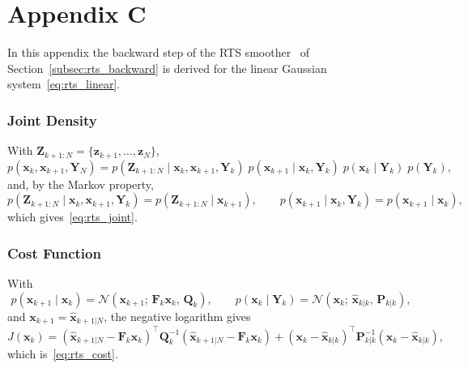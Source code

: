 \chapter*{Appendix C}
\label{app:rts}

In this appendix the backward step of the RTS smoother~\cite{rauch1965,sarkka2013book} of
Section~\ref{subsec:rts_backward} is derived for the linear Gaussian
system~\eqref{eq:rts_linear}.

\subsection*{Joint Density}

With $\mathbf{Z}_{k+1:N} = \{\mathbf{z}_{k+1}, \dots, \mathbf{z}_N\}$,
\begin{equation}
    p(\mathbf{x}_k, \mathbf{x}_{k+1}, \mathbf{Y}_N) =
    p(\mathbf{Z}_{k+1:N} \mid \mathbf{x}_k, \mathbf{x}_{k+1}, \mathbf{Y}_k)\;
    p(\mathbf{x}_{k+1} \mid \mathbf{x}_k, \mathbf{Y}_k)\;
    p(\mathbf{x}_k \mid \mathbf{Y}_k)\;
    p(\mathbf{Y}_k),
\end{equation}
and, by the Markov property,
\begin{equation}
    p(\mathbf{Z}_{k+1:N} \mid \mathbf{x}_k, \mathbf{x}_{k+1}, \mathbf{Y}_k)
    = p(\mathbf{Z}_{k+1:N} \mid \mathbf{x}_{k+1}),
    \qquad
    p(\mathbf{x}_{k+1} \mid \mathbf{x}_k, \mathbf{Y}_k) = p(\mathbf{x}_{k+1} \mid \mathbf{x}_k),
\end{equation}
which gives~\eqref{eq:rts_joint}.

\subsection*{Cost Function}

With
\begin{equation}
    p(\mathbf{x}_{k+1} \mid \mathbf{x}_k) = \mathcal{N}\!\left(\mathbf{x}_{k+1};\,
    \mathbf{F}_k\mathbf{x}_k,\, \mathbf{Q}_k\right),
    \qquad
    p(\mathbf{x}_k \mid \mathbf{Y}_k) = \mathcal{N}\!\left(\mathbf{x}_k;\,
    \hat{\mathbf{x}}_{k|k},\, \mathbf{P}_{k|k}\right),
\end{equation}
and $\mathbf{x}_{k+1} = \hat{\mathbf{x}}_{k+1|N}$, the negative logarithm gives
\begin{equation}
    J(\mathbf{x}_k) =
    \left(\hat{\mathbf{x}}_{k+1|N} - \mathbf{F}_k\mathbf{x}_k\right)^\top \mathbf{Q}_k^{-1}
    \left(\hat{\mathbf{x}}_{k+1|N} - \mathbf{F}_k\mathbf{x}_k\right)
    + \left(\mathbf{x}_k - \hat{\mathbf{x}}_{k|k}\right)^\top \mathbf{P}_{k|k}^{-1}
    \left(\mathbf{x}_k - \hat{\mathbf{x}}_{k|k}\right),
\end{equation}
which is~\eqref{eq:rts_cost}.

